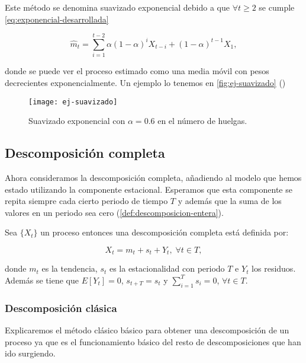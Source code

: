 Este método se denomina suavizado exponencial debido a que $\forall t \geq 2$ se cumple \eqref{eq:exponencial-desarrollada}

\begin{equation}
  \hat{m}_t = \sum \limits^{t - 2}_{i = 1} \alpha(1 - \alpha)^i X_{t - i} + (1 - \alpha)^{t - 1} X_1,
  \label{eq:exponencial-desarrollada}
\end{equation}

donde se puede ver el proceso estimado como una media móvil con pesos decrecientes exponencialmente. Un ejemplo lo tenemos en \autoref{fig:ej-suavizado} (\cite{brockwell2002introduction})

\begin{figure}[htpb]
  \centering
  \texttt{[image: ej-suavizado]}
  \caption{Suavizado exponencial con $\alpha = 0.6$ en el número de huelgas.}
  \label{fig:ej-suavizado}
\end{figure}

\subsection{Descomposición completa}

Ahora consideramos la descomposición completa, añadiendo al modelo que hemos estado utilizando la componente estacional. Esperamos que esta componente se repita siempre cada cierto periodo de tiempo $T$ y además que la suma de los valores en un periodo sea cero (\autoref{def:descomposicion-entera}).

\begin{definicion}
  Sea $\{X_t\}$ un proceso entonces una descomposición completa está definida por:

  $$ X_t = m_t + s_t + Y_t, \; \forall t \in T,$$

  donde $m_t$ es la tendencia, $s_t$ es la estacionalidad con periodo $T$ e $Y_t$ los residuos.  Además se tiene que $E[Y_t] = 0$, $s_{t + T} = s_{t}$ y $\sum \limits^{T}_{i = 1} s_i = 0$, $\forall t \in T$.
  \label{def:descomposicion-entera}
\end{definicion}

\subsubsection{Descomposición clásica}

Explicaremos el método clásico básico para obtener una descomposición de un proceso ya que es el funcionamiento básico del resto de descomposiciones que han ido surgiendo.

